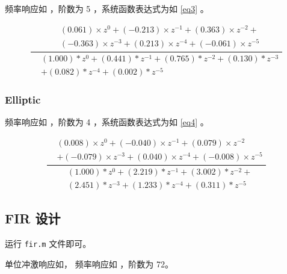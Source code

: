 \documentclass[lang=cn,11pt,a4paper,cite=authoryear]{elegantpaper}
\begin{document}
频率响应如  ，阶数为 5 ，系统函数表达式为如 \eqref{eq3} 。


\begin{equation}\label{eq3}
    \dfrac{\begin{aligned}
        &(0.061) \times z^{0} + (-0.213) \times z^{-1} + (0.363) \times z^{-2} + \\
        &(-0.363) \times z^{-3} + (0.213) \times z^{-4} + (-0.061) \times z^{-5} 
    \end{aligned}}{\begin{aligned}
        &(1.000) * z^{0} + (0.441) * z^{-1} + (0.765) * z^{-2} + (0.130) * z^{-3} \\
        &+ (0.082) * z^{-4} + (0.002) * z^{-5}
    \end{aligned} }
\end{equation}


\subsubsection{Elliptic}

频率响应如  ，阶数为 4 ，系统函数表达式为如 \eqref{eq4} 。


\begin{equation}\label{eq4}
\dfrac{\begin{aligned}
    &(0.008) \times z^{0} + (-0.040) \times z^{-1} + (0.079) \times z^{-2} \\
    &+ (-0.079) \times z^{-3} + (0.040) \times z^{-4} + (-0.008) \times z^{-5} 
\end{aligned}}{\begin{aligned}
    & (1.000) * z^{0} + (2.219) * z^{-1} + (3.002) * z^{-2} + \\
    &  (2.451) * z^{-3} + (1.233) * z^{-4} + (0.311) * z^{-5} 
\end{aligned}}
\end{equation}


\subsection{FIR 设计}

运行 \lstinline{fir.m} 文件即可。

单位冲激响应如， 频率响应如 ，阶数为 72。


\end{document}
